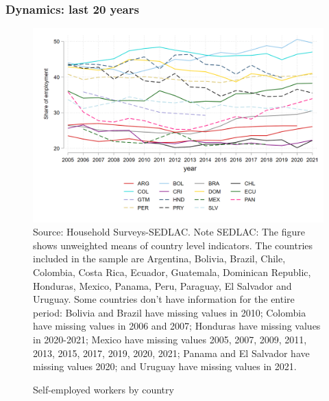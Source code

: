 \documentclass{beamer}
\begin{document}
\begin{frame}
\frametitle{Dynamics: last 20 years}
\begin{figure}[!htb]
        \justifying
        \caption{Self-employed workers by country}     
        \includegraphics[scale=.2]{latex/figures/Evolution/self_employed_all.png}
        \label{fig:Evolution_selfemployed}
        \footnotesize{Source: Household Surveys-SEDLAC.}
       \footnotesize{Note SEDLAC: The figure shows unweighted means of country level indicators. The countries included in the sample are Argentina, Bolivia, Brazil, Chile, Colombia, Costa Rica, Ecuador, Guatemala, Dominican Republic, Honduras, Mexico, Panama, Peru, Paraguay, El Salvador and Uruguay. Some countries don’t have information for the entire period: Bolivia and Brazil have missing values in 2010; Colombia have missing values in 2006 and 2007; Honduras have missing values in 2020-2021; Mexico have missing values 2005, 2007, 2009, 2011, 2013, 2015, 2017, 2019, 2020, 2021; Panama and El Salvador have missing values 2020; and Uruguay have missing values in 2021.}
 \end{figure}
 \end{frame}
\end{document}
